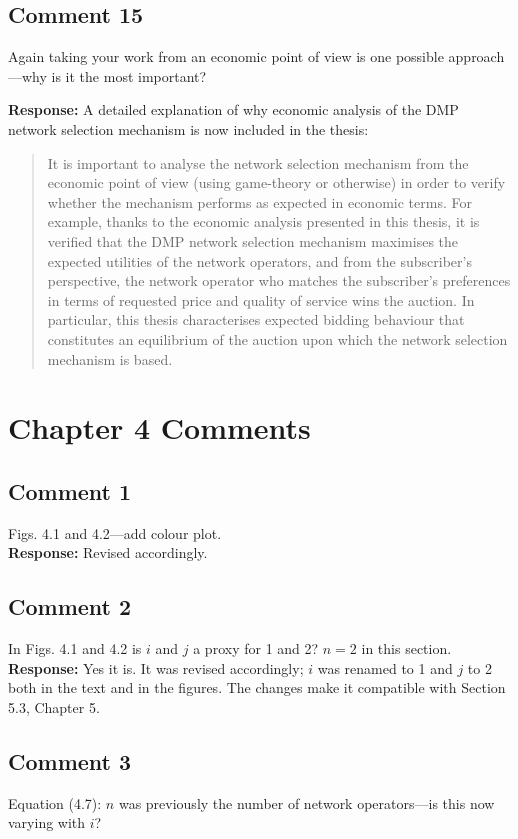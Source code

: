 \documentclass[10pt,a4paper,notitlepage]{article}
\numberwithin{equation}{section}
\begin{document}
\subsection{Comment 15}
Again taking your work from an economic point of view is one possible approach---why is it the most important?

\textbf{Response:}
A detailed explanation of why economic analysis of the DMP network selection mechanism is now included in the thesis:
\begin{quote}
It is important to analyse the network selection mechanism from the economic point of view (using game-theory or otherwise) in order to verify whether the mechanism performs as expected in economic terms. For example, thanks to the economic analysis presented in this thesis, it is verified that the DMP network selection mechanism maximises the expected utilities of the network operators, and from the subscriber's perspective, the network operator who matches the subscriber's preferences in terms of requested price and quality of service wins the auction. In particular, this thesis characterises expected bidding behaviour that constitutes an equilibrium of the auction upon which the network selection mechanism is based.
\end{quote}

\clearpage

\section{Chapter 4 Comments}
\subsection{Comment 1}
Figs. 4.1 and 4.2---add colour plot.\\[-2ex]

\textbf{Response:}
Revised accordingly.

\subsection{Comment 2}
In Figs. 4.1 and 4.2 is $i$ and $j$ a proxy for 1 and 2? $n=2$ in this section.\\[-2ex]

\textbf{Response:}
Yes it is. It was revised accordingly; $i$ was renamed to 1 and $j$ to 2 both in the text and in the figures. The changes make it compatible with Section 5.3, Chapter 5.

\subsection{Comment 3}
Equation (4.7): $n$ was previously the number of network operators---is this now varying with $i$?\\[-2ex]
\end{document}
